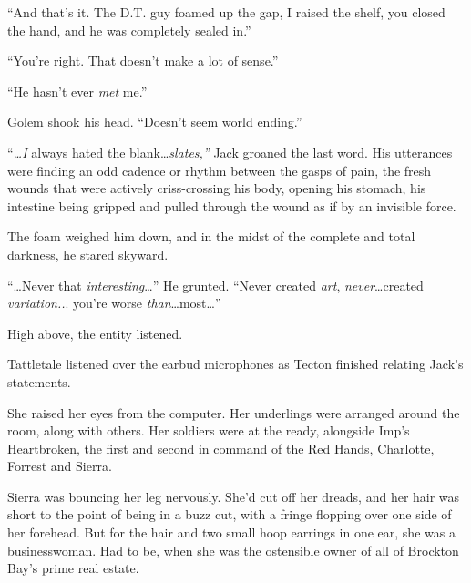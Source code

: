 ``And that's it.  The D.T. guy foamed up the gap, I raised the shelf, you closed the hand, and he was completely sealed in.''



``You're right.  That doesn't make a lot of sense.''



``He hasn't ever \emph{met} me.''



Golem shook his head.  ``Doesn't seem world ending.''



\sectionbreak



``\emph{\ldots}\emph{I }always hated the blank\ldots \emph{slates,'' }Jack groaned the last word.  His utterances were finding an odd cadence or rhythm between the gasps of pain, the fresh wounds that were actively criss-crossing his body, opening his stomach, his intestine being gripped and pulled through the wound as if by an invisible force.



The foam weighed him down, and in the midst of the complete and total darkness, he stared skyward.



``\ldots{}Never that \emph{interesting}\ldots''  He grunted.  ``Never created \emph{art}, \emph{never}\ldots created \emph{variation..}.  you're worse \emph{than}\ldots most\ldots''



High above, the entity listened.



\sectionbreak



Tattletale listened over the earbud microphones as Tecton finished relating Jack's statements.



She raised her eyes from the computer.  Her underlings were arranged around the room, along with others.  Her soldiers were at the ready, alongside Imp's Heartbroken,  the first and second in command of the Red Hands, Charlotte, Forrest and Sierra.



Sierra was bouncing her leg nervously.  She'd cut off her dreads, and her hair was short to the point of being in a buzz cut, with a fringe flopping over one side of her forehead.  But for the hair and two small hoop earrings in one ear, she was a businesswoman.  Had to be, when she was the ostensible owner of all of Brockton Bay's prime real estate.



